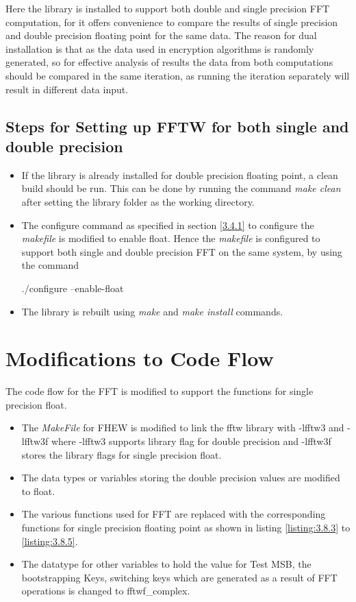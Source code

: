 Here the library is installed to support both double and single precision FFT computation, for it offers convenience to compare the results of single precision and double precision floating point for the same data. The reason for dual installation is that as the data used in encryption algorithms is randomly generated, so for effective analysis of results the data from both computations should be compared in the same iteration, as running the iteration separately will result in different data input.
\subsection{Steps for Setting up FFTW for both single and double precision}
\begin{itemize}
\item
If the library is already installed for double precision floating point, a clean build should be run. This can be done by running the command \textit{make clean} after setting the library folder as the working directory.
\item
The configure command as specified in section \ref{3.4.1} to configure the \textit{makefile} is modified to enable float. Hence the \textit{makefile} is configured to support both single and double precision FFT on the same system, by using the command

\hspace{3cm} ./configure --enable-float
\item
The library is rebuilt using \textit{make} and \textit{make install}  commands.
\end{itemize}
\section {Modifications to Code Flow}
The code flow for the FFT is modified to support the functions for single precision float.
\begin{itemize}
\item
The \textit{MakeFile} for FHEW is modified to link the fftw library with -lfftw3 and -lfftw3f where -lfftw3 supports library flag for double precision and -lfftw3f stores the library flags for single precision float.


\item 
The data types or variables storing the double precision values are modified to float.

\item
The various functions used for FFT are replaced with the corresponding functions for single precision floating point as shown in listing \ref{listing:3.8.3} to \ref{listing:3.8.5}.





\item
The datatype for other variables to hold the value for Test MSB, the bootstrapping Keys, switching keys which are generated as a result of FFT operations is changed to fftwf\_complex. 


\end{itemize}
